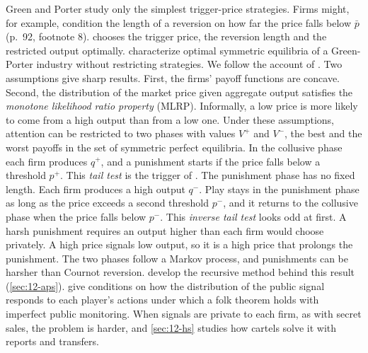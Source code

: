 Green and Porter study only the simplest trigger-price strategies. Firms might, for example, condition the length of
a reversion on how far the price falls below $\bar p$ (p.~92, footnote 8).  chooses the trigger
price, the reversion length and the restricted output optimally.  characterize
optimal symmetric equilibria of a Green-Porter industry without restricting strategies. We follow the account of
\citet[section~6.7.1.2]{Tirole1988}. Two assumptions give sharp results. First, the firms' payoff functions are
concave. Second, the distribution of the market price given aggregate output satisfies the \emph{monotone likelihood
ratio property} (MLRP). Informally, a low price is more likely to come from a high output than from a low one. Under these
assumptions, attention can be restricted to two phases with values $V^+$ and $V^-$, the best and the worst payoffs in
the set of symmetric perfect equilibria. In the collusive phase each firm produces $q^+$, and a punishment starts if
the price falls below a threshold $p^+$. This \emph{tail test} is the trigger of \citet{GreenPorter1984}. The
punishment phase has no fixed length. Each firm produces a high output $q^-$. Play stays in the punishment phase as
long as the price exceeds a second threshold $p^-$, and it returns to the collusive phase when the price falls below
$p^-$. This \emph{inverse tail test} looks odd at first. A harsh punishment requires an output higher than each firm
would choose privately. A high price signals low output, so it is a high price that prolongs the punishment. The
two phases follow a Markov process, and punishments can be harsher than Cournot reversion.  develop the recursive method behind this result (\cref{sec:12-aps}).
 give conditions on how the distribution of the public signal responds to each
player's actions under which a folk theorem holds with imperfect public monitoring. When signals are private to each
firm, as with secret sales, the problem is harder, and \cref{sec:12-hs} studies how cartels solve it with reports and
transfers.

